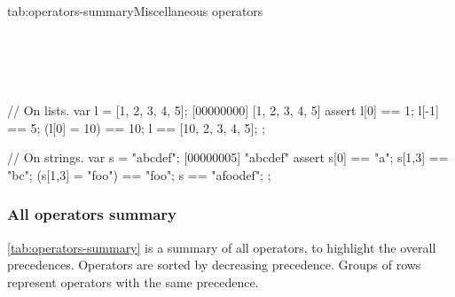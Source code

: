 \begin{operatorTable}{tab:operators-summary}{Miscellaneous operators}
  \operatordot\\
  \operatordota\\
  \hline
  \operatorprop\\
  \operatorpropass\\
  \hline
  \operatorsub\\
  \operatorsubass
\end{operatorTable}

\begin{urbiscript}
// On lists.
var l = [1, 2, 3, 4, 5];
[00000000] [1, 2, 3, 4, 5]
assert
{
  l[0] == 1;
  l[-1] == 5;
  (l[0] = 10) == 10;
  l == [10, 2, 3, 4, 5];
};

// On strings.
var s = "abcdef";
[00000005] "abcdef"
assert
{
  s[0] == "a";
  s[1,3] == "bc";
  (s[1,3] = "foo") == "foo";
  s == "afoodef";
};
\end{urbiscript}

\subsubsection{All operators summary}

\autoref{tab:operators-summary} is a summary of all operators, to
highlight the overall precedences. Operators are sorted by decreasing
precedence. Groups of rows represent operators with the same
precedence.

